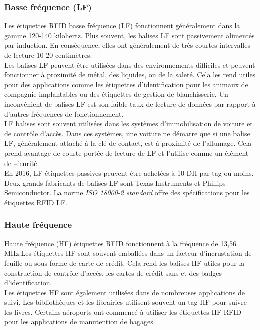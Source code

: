 \documentclass[11pt, a4paper, twoside]{book}
\begin{document}
\subsubsection{Basse fréquence (LF)}
Les étiquettes RFID basse fréquence (LF) fonctionnent généralement dans la gamme 120-140 kilohertz. Plus souvent, les balises LF sont passivement alimentés par induction. En conséquence, elles ont généralement de très courtes intervalles de lecture 10-20 centimètres.\\

Les balises LF peuvent être utilisées dans des environnements difficiles et peuvent fonctionner à proximité de métal, des liquides, ou de la saleté. Cela les rend utiles pour des applications comme les étiquettes d'identification pour les animaux de compagnie implantables ou des étiquettes de gestion de blanchisserie. Un inconvénient de balises LF est son faible taux de lecture de données par rapport à d'autres fréquences de fonctionnement.\\

LF balises sont souvent utilisées dans les systèmes d'immobilisation de voiture et de contrôle d'accès. Dans ces systèmes, une voiture ne démarre que si une balise LF, généralement attaché à la clé de contact, est à proximité de l'allumage. Cela prend avantage de courte portée de lecture de LF et l'utilise comme un élément de sécurité.\\

En 2016, LF étiquettes passives peuvent être achetées  à 10 DH par tag ou moins. Deux grands fabricants de balises LF sont Texas Instruments et Phillips Semiconductor. La norme \emph{ISO 18000-2 standard} \cite{iso2} offre des spécifications pour les étiquettes RFID LF.

\subsubsection{Haute fréquence}
Haute fréquence (HF) étiquettes RFID fonctionnent à la fréquence de 13,56 MHz.Les étiquettes HF sont souvent emballées dans un facteur d'incrustation de feuille ou sous forme de carte de crédit. Cela rend les balises HF utiles pour la construction de contrôle d'accès, les cartes de crédit sans et des badges d'identification.\\

Les étiquettes HF sont également utilisées dans de nombreuses applications de suivi. Les bibliothèques et les librairies utilisent souvent un tag HF pour suivre les livres. Certains aéroports ont commencé à utiliser les étiquettes HF RFID pour les applications de manutention de bagages.\\
\end{document}
